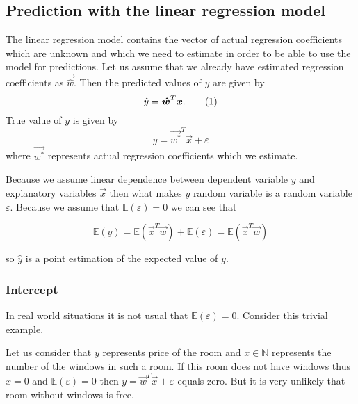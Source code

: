 \subsection{Prediction with the linear regression model}
The linear regression model contains the vector of actual regression coefficients which are unknown and which we need to estimate in order to be able to use the model for predictions. Let us assume that we already have estimated regression coefficients as $\vec{\hat{w}}$. Then the predicted values of $y$ are given by
\begin{equation}
    \hat{y} = \vec{\hat{w}}^T\vec{x}. \numberthis
\end{equation}
True value of $y$ is given by 
\begin{equation}
    y = \vec{w^{*}}^T\vec{x} + \varepsilon
\end{equation}
where $ \vec{w^{*}}$  represents actual regression coefficients which we estimate. 

Because we assume linear dependence between dependent variable $y$ and explanatory variables $\vec{x}$ then what makes $y$ random variable is a random variable $\varepsilon$. Because we assume that $\mathbb{E}(\varepsilon) = 0$ we can see that 

\begin{equation} \label{equation:vary}
\mathbb{E}(y) =\mathbb{E}(\vec{x}^T\vec{w}) + \mathbb{E}(\varepsilon) = \mathbb{E}(\vec{x}^T\vec{w})
\end{equation}

so $\hat{y}$ is a point estimation of the expected value of $y$.

\subsubsection{Intercept}
In real world situations it is not usual that $\mathbb{E}(\varepsilon) = 0$. Consider this trivial example.
\begin{example} \label{example:intercept}
Let us consider that $y$ represents price of the room and $x \in \mathbb{N}$ represents the number of the windows in such a room. If this room does not have windows thus $x = 0$ and $\mathbb{E}(\varepsilon) = 0$ then $ y = \vec{w}^T\vec{x} + \varepsilon$ equals zero. But it is very unlikely that room without windows is free. 
\end{example}

